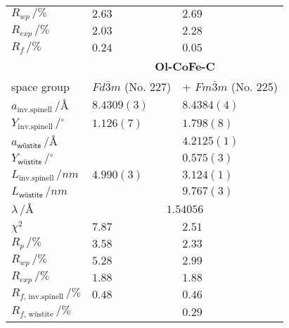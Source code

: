\documentclass[\main/dresen_thesis.tex]{subfiles}
\begin{document}
\begin{table}[ht]
\begin{tabular}{ l | l | l }
      \rule{0pt}{2ex} $R_{wp} \,/ \unit{\%}$                        & $2.63$             & $2.69$ \\
      \rule{0pt}{2ex} $R_{exp} \,/ \unit{\%}$                       & $2.03$             & $2.28$ \\
      \rule{0pt}{2ex} $R_{f} \,/ \unit{\%}$                         & $0.24$             & $0.05$ \\
      \hline
      \hline
      \rule{0pt}{2ex} & \multicolumn{2}{c}{\textbf{Ol-CoFe-C}}\\
      \hline
      \hline
      \rule{0pt}{2ex}space group & $Fd\bar{3}m$ (No. 227) & + $Fm\bar{3}m$ (No. 225)\\
      \hline
      \rule{0pt}{2ex} $a_\mathrm{inv. spinell} \,/ \unit{\angstrom}$         & $8.4309(3)$ & $8.4384(4)$  \\
      \rule{0pt}{2ex} $Y_\mathrm{inv. spinell} \,/ \unit{^\circ}$            & $1.126(7)$  & $1.798(8)$   \\
      \rule{0pt}{2ex} $a_\textsf{w\"ustite}     \,/ \unit{\angstrom}$        &             & $4.2125(1)$  \\
      \rule{0pt}{2ex} $Y_\textsf{w\"ustite}     \,/ \unit{^\circ}$           &             & $0.575(3)$   \\
      \hline
      \rule{0pt}{2ex} $L_\mathrm{inv. spinell} \,/ \unit{nm}$                & $4.990(3)$  & $3.124(1)$ \\
      \rule{0pt}{2ex} $L_\textsf{w\"ustite}      \,/ \unit{nm}$              &             & $9.767(3)$ \\
      \hline
      \rule{0pt}{2ex} $\lambda \,/ \unit{\angstrom}$  & \multicolumn{2}{c}{$1.54056$}\\
      \hline
      \rule{0pt}{2ex} $\chi^2$                                               & $7.87$      & $2.51$ \\
      \rule{0pt}{2ex} $R_p \,/ \unit{\%}$                                                  & $3.58$      & $2.33$ \\
      \rule{0pt}{2ex} $R_{wp} \,/ \unit{\%}$                                               & $5.28$      & $2.99$ \\
      \rule{0pt}{2ex} $R_{exp} \,/ \unit{\%}$                                              & $1.88$      & $1.88$ \\
      \rule{0pt}{2ex} $R_{f, \, \mathrm{inv. spinell}} \,/ \unit{\%}$                      & $0.48$      & $0.46$ \\
      \rule{0pt}{2ex} $R_{f, \, \text{w\"ustite}} \,/ \unit{\%}$                           &             & $0.29$ \\
      \hline
    \end{tabular}
  \end{table}
\end{document}
